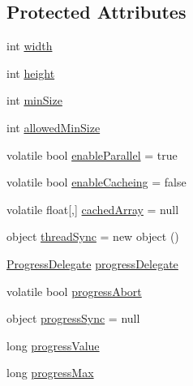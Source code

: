 \subsection*{\-Protected \-Attributes}
\begin{DoxyCompactItemize}
\item 
int \hyperlink{class_turbo_wavelets_1_1_wavelet2_d_aaa4b3711957fe1798980e6891331a08d}{width}
\item 
int \hyperlink{class_turbo_wavelets_1_1_wavelet2_d_afb2aa87b89b82f329357cbdc0cde18a8}{height}
\item 
int \hyperlink{class_turbo_wavelets_1_1_wavelet2_d_af5148ef1a46dd5694ccea13aa8f1b9e2}{min\-Size}
\item 
int \hyperlink{class_turbo_wavelets_1_1_wavelet2_d_a949bac2b4f540092cf7cc8916968cdc0}{allowed\-Min\-Size}
\item 
volatile bool \hyperlink{class_turbo_wavelets_1_1_wavelet2_d_a742fff705da3ff5a4b6d67e9a56637be}{enable\-Parallel} = true
\item 
volatile bool \hyperlink{class_turbo_wavelets_1_1_wavelet2_d_a2b5e1636f40bab5b6ee88f6e8bb1b653}{enable\-Cacheing} = false
\item 
volatile float\mbox{[},\mbox{]} \hyperlink{class_turbo_wavelets_1_1_wavelet2_d_a07949ac8b81d7afa1776e92f11b74834}{cached\-Array} = null
\item 
object \hyperlink{class_turbo_wavelets_1_1_wavelet2_d_ad69614eed43d939d02cf11076f95adee}{thread\-Sync} = new object ()
\item 
\hyperlink{class_turbo_wavelets_1_1_wavelet2_d_aec52fe74aa08e073119064ef4ac3fe93}{\-Progress\-Delegate} \hyperlink{class_turbo_wavelets_1_1_wavelet2_d_a41d9135f22a6b2cb661b2cc2ccb768ff}{progress\-Delegate}
\item 
volatile bool \hyperlink{class_turbo_wavelets_1_1_wavelet2_d_adb4984a01d9ab29c0056b18cbbcdef6f}{progress\-Abort}
\item 
object \hyperlink{class_turbo_wavelets_1_1_wavelet2_d_a08a8ff6259f0d66913715c00ed6e167b}{progress\-Sync} = null
\item 
long \hyperlink{class_turbo_wavelets_1_1_wavelet2_d_ad2fad1f07e9e5c4901c0cdc925991e49}{progress\-Value}
\item 
long \hyperlink{class_turbo_wavelets_1_1_wavelet2_d_a7cbf7ce44310a48178f36101a4c03add}{progress\-Max}
\end{DoxyCompactItemize}
